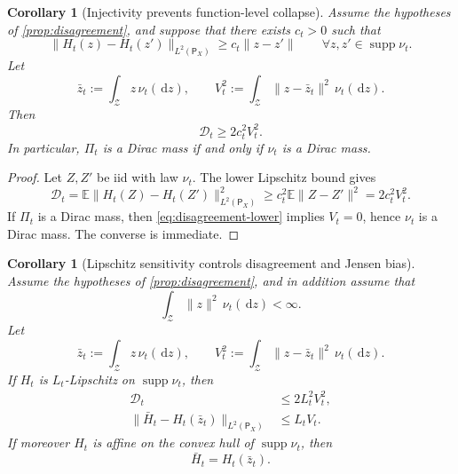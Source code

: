 \documentclass{article}
\newtheorem{corollary}[theorem]{Corollary}
\theoremstyle{definition}
\newcommand{\E}{\mathbb{E}}
\newcommand{\dd}{\,\mathrm{d}}
\begin{document}
\begin{corollary}[Injectivity prevents function-level collapse]
\label{cor:injective}
Assume the hypotheses of \cref{prop:disagreement}, and suppose that there exists
$c_t>0$ such that
\[
  \|H_t(z)-H_t(z')\|_{L^2(\mathsf P_X)}
  \ge
  c_t\|z-z'\|
  \qquad
  \forall z,z'\in\operatorname{supp}\nu_t.
\]
Let
\[
  \bar z_t := \int_{\mathcal Z} z\,\nu_t(\dd z),
  \qquad
  V_t^2 := \int_{\mathcal Z}\|z-\bar z_t\|^2\,\nu_t(\dd z).
\]
Then
\begin{equation}
  \mathcal D_t \ge 2c_t^2 V_t^2.
  \label{eq:disagreement-lower}
\end{equation}
In particular, $\Pi_t$ is a Dirac mass if and only if $\nu_t$ is a Dirac mass.
\end{corollary}

\begin{proof}
Let $Z,Z'$ be iid with law $\nu_t$. The lower Lipschitz bound gives
\[
  \mathcal D_t
  =
  \E\|H_t(Z)-H_t(Z')\|_{L^2(\mathsf P_X)}^2
  \ge
  c_t^2 \E\|Z-Z'\|^2
  =
  2c_t^2 V_t^2.
\]
If $\Pi_t$ is a Dirac mass, then \eqref{eq:disagreement-lower} implies
$V_t=0$, hence $\nu_t$ is a Dirac mass. The converse is immediate.
\end{proof}

\begin{corollary}[Lipschitz sensitivity controls disagreement and Jensen bias]
\label{cor:bias}
Assume the hypotheses of \cref{prop:disagreement}, and in addition assume that
\[
  \int_{\mathcal Z}\|z\|^2\,\nu_t(\dd z)<\infty.
\]
Let
\[
  \bar z_t := \int_{\mathcal Z} z\,\nu_t(\dd z),
  \qquad
  V_t^2 := \int_{\mathcal Z}\|z-\bar z_t\|^2\,\nu_t(\dd z).
\]
If $H_t$ is $L_t$-Lipschitz on $\operatorname{supp}\nu_t$, then
\begin{align}
  \mathcal D_t &\le 2L_t^2 V_t^2,
  \label{eq:disagreement-lip}
  \\
  \|\bar H_t-H_t(\bar z_t)\|_{L^2(\mathsf P_X)}
  &\le
  L_t V_t.
  \label{eq:bias-lip}
\end{align}
If moreover $H_t$ is affine on the convex hull of $\operatorname{supp}\nu_t$,
then
\begin{equation}
  \bar H_t = H_t(\bar z_t).
  \label{eq:bias-affine}
\end{equation}
\end{corollary}
\end{document}
